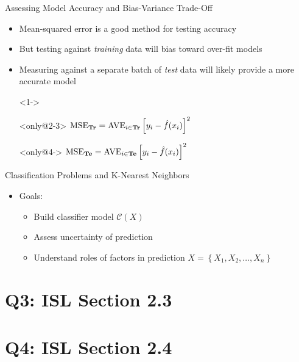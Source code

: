 \documentclass{beamer}
\begin{document}
\begin{frame}{Assessing Model Accuracy and Bias-Variance Trade-Off}
	\begin{itemize}
		\item<1-> Mean-squared error is a good method for testing accuracy
		\item<3-> But testing against \emph{training} data will bias toward over-fit models
		\item<4-> Measuring against a separate batch of \emph{test} data will likely provide a more accurate model 
		\item[]<1->
		\item[]<only@2-3> \hspace{3em}
			$\text{MSE}_{\text{\textbf{Tr}}}=\text{AVE}_{i\in\text{\textbf{Tr}}}\left[y_i-\hat{f}(x_i)\right]^2$
		\item[]<only@4-> \hspace{3em}
			$\text{MSE}_{\text{\textbf{Te}}}=\text{AVE}_{i\in\text{\textbf{Te}}}\left[y_i-\hat{f}(x_i)\right]^2$
	\end{itemize}
\end{frame}


\begin{frame}{Classification Problems and K-Nearest Neighbors}
	\begin{itemize}[<+->]
		\item Goals:
		\begin{itemize}[<+->]
			\item Build classifier model $\mathcal{C}(X)$
			\item Assess uncertainty of prediction
			\item Understand roles of factors in prediction $X =\left\lbrace X_1, X_2, \ldots, X_n \right\rbrace $
		\end{itemize}
	\end{itemize}
\end{frame}

\section[Q3]{Q3: ISL Section 2.3}
\section[Q4]{Q4: ISL Section 2.4}
\end{document}

